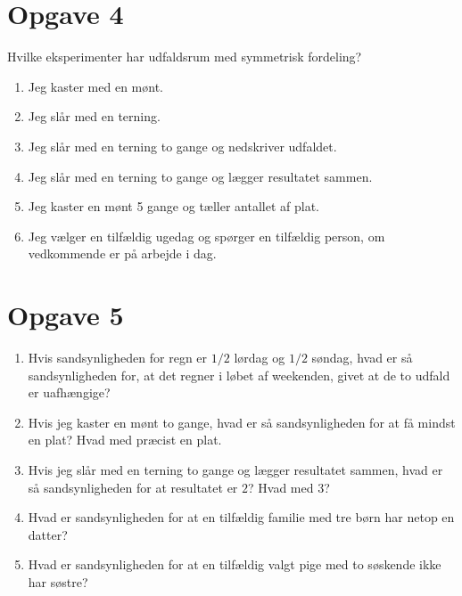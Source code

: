 \section*{Opgave 4}
Hvilke eksperimenter har udfaldsrum med symmetrisk fordeling?
\begin{enumerate}[label=\roman*)]
\item Jeg kaster med en mønt.
\item Jeg slår med en terning.
\item Jeg slår med en terning to gange og nedskriver udfaldet.
\item Jeg slår med en terning to gange og lægger resultatet sammen.
\item Jeg kaster en mønt 5 gange og tæller antallet af plat.
\item Jeg vælger en tilfældig ugedag og spørger en tilfældig person, om vedkommende er på arbejde i dag. 
\end{enumerate}
\section*{Opgave 5}
\begin{enumerate}[label=\roman*)]
\item Hvis sandsynligheden for regn er $1/2$ lørdag og $1/2$ søndag, hvad er så sandsynligheden for, at det regner i løbet af weekenden, givet at de to udfald er uafhængige?
\item Hvis jeg kaster en mønt to gange, hvad er så sandsynligheden for at få mindst en plat? Hvad med præcist en plat.
\item Hvis jeg slår med en terning to gange og lægger resultatet sammen, hvad er så sandsynligheden for at resultatet er $2$? Hvad med $3$?
\item Hvad er sandsynligheden for at en tilfældig familie med tre børn har netop en datter?
\item Hvad er sandsynligheden for at en tilfældig valgt pige med to søskende ikke har søstre?
\end{enumerate}